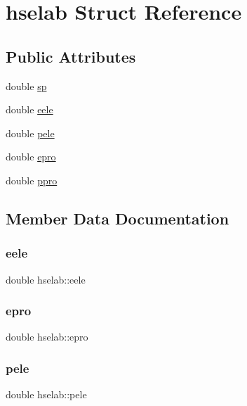 \hypertarget{structhselab}{}\section{hselab Struct Reference}
\label{structhselab}
\subsection*{Public Attributes}
\begin{DoxyCompactItemize}
\item 
double \hyperlink{structhselab_ab0c3f6d0a07afa7b5e019ebd7d08b34f}{sp}
\item 
double \hyperlink{structhselab_a36fe90d30c0f97847f26055c74ca943b}{eele}
\item 
double \hyperlink{structhselab_a16c1511f1d3110a5b1130c331d8e2ac9}{pele}
\item 
double \hyperlink{structhselab_aa472fb9517ea3f67f6979a67f48f1fb1}{epro}
\item 
double \hyperlink{structhselab_af756f7122657e3414cf16a37c43b2783}{ppro}
\end{DoxyCompactItemize}


\subsection{Member Data Documentation}
\mbox{\label{structhselab_a36fe90d30c0f97847f26055c74ca943b}} 
\subsubsection{\texorpdfstring{eele}{eele}}
{\footnotesize\ttfamily double hselab\+::eele}

\mbox{\label{structhselab_aa472fb9517ea3f67f6979a67f48f1fb1}} 
\subsubsection{\texorpdfstring{epro}{epro}}
{\footnotesize\ttfamily double hselab\+::epro}

\mbox{\label{structhselab_a16c1511f1d3110a5b1130c331d8e2ac9}} 
\subsubsection{\texorpdfstring{pele}{pele}}
{\footnotesize\ttfamily double hselab\+::pele}

